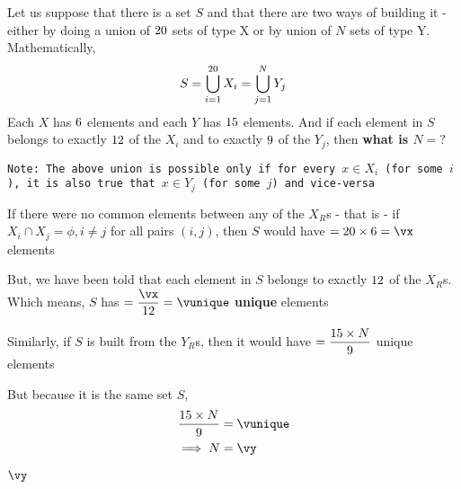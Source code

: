 

\MULTIPLY\va\vc\vx
\DIVIDE\vx\vd\vunique
\MULTIPLY\vunique\ve\a
\DIVIDE\a\vb\vy

\question[5] Let us suppose that there is a set $S$ and that there are two ways of building it - 
either by doing a union of $20$ sets of type X or by union of $N$ sets of type Y.
Mathematically, 
    \[ S = \bigcup_{i=1}^{20} X_i = \bigcup_{j=1}^N Y_j\]
Each $X$ has $6$ elements and each $Y$ has $15$ elements. And if each element in $S$ belongs to 
exactly $12$ of the $X_i$ and to exactly $9$ of the $Y_j$, then \textbf{ what is $N=?$}

\texttt{Note: The above union is possible only if for every $x\in X_i$ (for some $i$), it is also true that $x\in Y_j$ 
(for some $j$) and vice-versa} 

\watchout[-4cm]

\ifprintanswers
\fi 

\begin{solution}[\fullpage]
  If there were no common elements between any of the $X_R$s - that is - 
  if $X_i\cap X_j = \phi,i\neq j$ for all pairs $(i,j)$, then $S$ would have 
  $=\vc\times\va = \vx$ elements

  But, we have been told that each element in $S$ belongs to exactly $12$ of the $X_R$s.
  Which means, $S$ has $ =\dfrac\vx\vd = \vunique$ \textbf{unique} elements

  Similarly, if $S$ is built from the $Y_R$s, then it would have $=\dfrac{15\times N}{9}$ 
  unique elements 

  But because it is the same set $S$, 
  \begin{align}
    \dfrac{\vb\times N}{\ve} &= \vunique \\
    \implies N &= \vy
  \end{align}
\end{solution}

\ifprintanswers\begin{codex}$\vy$\end{codex}\fi
